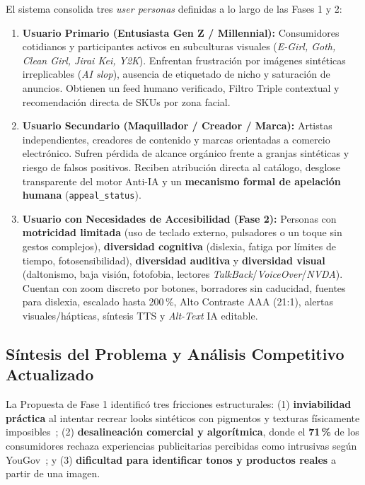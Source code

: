 \documentclass[conference]{IEEEtran}
\begin{document}
El sistema consolida tres \textit{user personas} definidas a lo largo de las Fases 1 y 2:
\begin{enumerate}
    \item \textbf{Usuario Primario (Entusiasta Gen Z / Millennial):} Consumidores cotidianos y participantes activos en subculturas visuales (\textit{E-Girl, Goth, Clean Girl, Jirai Kei, Y2K}). Enfrentan frustración por imágenes sintéticas irreplicables (\textit{AI slop}), ausencia de etiquetado de nicho y saturación de anuncios. Obtienen un feed humano verificado, Filtro Triple contextual y recomendación directa de SKUs por zona facial.
    \item \textbf{Usuario Secundario (Maquillador / Creador / Marca):} Artistas independientes, creadores de contenido y marcas orientadas a comercio electrónico. Sufren pérdida de alcance orgánico frente a granjas sintéticas y riesgo de falsos positivos. Reciben atribución directa al catálogo, desglose transparente del motor Anti-IA y un \textbf{mecanismo formal de apelación humana} (\texttt{appeal\_status}).
    \item \textbf{Usuario con Necesidades de Accesibilidad (Fase 2):} Personas con \textbf{motricidad limitada} (uso de teclado externo, pulsadores o un toque sin gestos complejos), \textbf{diversidad cognitiva} (dislexia, fatiga por límites de tiempo, fotosensibilidad), \textbf{diversidad auditiva} y \textbf{diversidad visual} (daltonismo, baja visión, fotofobia, lectores \textit{TalkBack}/\textit{VoiceOver}/\textit{NVDA}). Cuentan con zoom discreto por botones, borradores sin caducidad, fuentes para dislexia, escalado hasta 200\,\%, Alto Contraste AAA (21:1), alertas visuales/hápticas, síntesis TTS y \textit{Alt-Text} IA editable.
\end{enumerate}

\subsection{Síntesis del Problema y Análisis Competitivo Actualizado}
La Propuesta de Fase 1 identificó tres fricciones estructurales: (1) \textbf{inviabilidad práctica} al intentar recrear looks sintéticos con pigmentos y texturas físicamente imposibles~\cite{ref8}; (2) \textbf{desalineación comercial y algorítmica}, donde el \textbf{71\,\%} de los consumidores rechaza experiencias publicitarias percibidas como intrusivas según YouGov~\cite{ref3}; y (3) \textbf{dificultad para identificar tonos y productos reales} a partir de una imagen.
\end{document}
